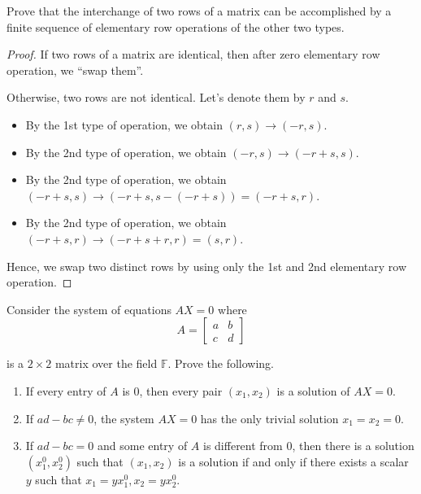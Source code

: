 \begin{exercise}
    Prove that the interchange of two rows of a matrix can be accomplished by a finite sequence of elementary row operations of the other two types.
\end{exercise}

\begin{proof}
    If two rows of a matrix are identical, then after zero elementary row operation, we ``swap them''.

    Otherwise, two rows are not identical. Let's denote them by $r$ and $s$.

    \begin{itemize}
        \item By the 1st type of operation, we obtain $(r, s) \to (-r, s)$.
        \item By the 2nd type of operation, we obtain $(-r, s) \to (-r+s, s)$.
        \item By the 2nd type of operation, we obtain $(-r+s, s) \to (-r+s, s - (-r+s)) = (-r+s, r)$.
        \item By the 2nd type of operation, we obtain $(-r+s, r) \to (-r+s+r, r) = (s, r)$.
    \end{itemize}

    Hence, we swap two distinct rows by using only the 1st and 2nd elementary row operation.
\end{proof}

\begin{exercise}
    Consider the system of equations $AX = 0$ where
    \[
        A =
        \begin{bmatrix}
            a & b \\
            c & d
        \end{bmatrix}
    \]

    is a $2\times 2$ matrix over the field $\mathbb{F}$. Prove the following.
    \begin{enumerate}[label={(\alph*)}]
        \item If every entry of $A$ is 0, then every pair $(x_{1}, x_{2})$ is a solution of $AX = 0$.
        \item If $ad - bc \ne 0$, the system $AX = 0$ has the only trivial solution $x_{1} = x_{2} = 0$.
        \item If $ad - bc = 0$ and some entry of $A$ is different from 0, then there is a solution $({x}^{0}_{1}, {x}^{0}_{2})$ such that $(x_{1}, x_{2})$ is a solution if and only if there exists a scalar $y$ such that $x_{1} = y{x}^{0}_{1}, x_{2} = y{x}^{0}_{2}$.
    \end{enumerate}
\end{exercise}

